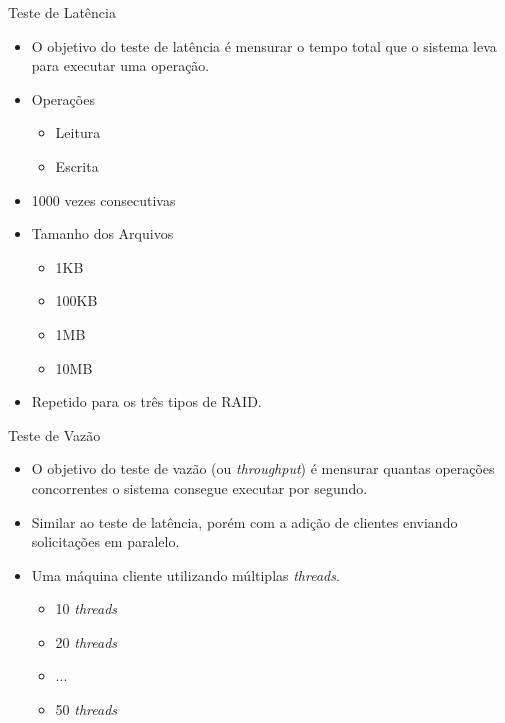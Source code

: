 \begin{frame}{Teste de Latência}
	\begin{itemize}
		\item O objetivo do teste de latência é mensurar o tempo total que o sistema leva para executar uma operação.
		\item Operações
		\begin{itemize}
			\item Leitura
			\item Escrita
		\end{itemize}
		\item 1000 vezes consecutivas
		\item Tamanho dos Arquivos
		\begin{itemize}
			\item 1KB
			\item 100KB
			\item 1MB
			\item 10MB
		\end{itemize}
		\item Repetido para os três tipos de RAID.
	\end{itemize}
\end{frame}

\begin{frame}{Teste de Vazão}
	\begin{itemize}
		\item O objetivo do teste de vazão (ou \textit{throughput}) é mensurar quantas operações concorrentes o sistema consegue executar por segundo.
		\item Similar ao teste de latência, porém com a adição de clientes enviando solicitações em paralelo.
		\item Uma máquina cliente utilizando múltiplas \textit{threads}.
		\begin{itemize}
			\item 10 \textit{threads}
			\item 20 \textit{threads}
			\item ...
			\item 50 \textit{threads}
		\end{itemize}
	\end{itemize}
\end{frame}